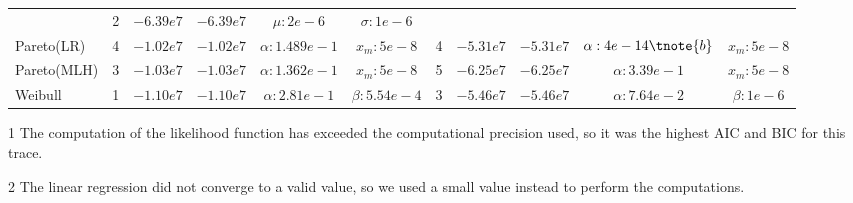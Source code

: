 \begin{table}[ht!]
{\begin{threeparttable}[t]
\begin{tabular}{lcccccccccc}
        &    2 & $-6.39e7$   & $-6.39e7$  & $\mu:2e-6$     & $\sigma:1e-6$ \\
        Pareto(LR)      &    4 & $-1.02e7$   & $-1.02e7$  & $\alpha:1.489e-1 $ & $x_m:5e-8 $    
        &    4 & $-5.31e7$   & $-5.31e7$  & $\alpha:4e-14\tnote{b}$ & $x_m:5e-8 $    \\
        Pareto(MLH)     &    3 & $-1.03e7$   & $-1.03e7$  & $\alpha:1.362e-1$ & $x_m:5e-8 $    
        &    5 & $-6.25e7$   & $-6.25e7$  & $\alpha:3.39e-1$ & $x_m:5e-8 $    \\
        Weibull         &    1 & $-1.10e7$   & $-1.10e7$  & $\alpha:2.81e-1$ & $\beta:5.54e-4$  
        &    3 & $-5.46e7$   & $-5.46e7$  & $\alpha:7.64e-2$ & $\beta:1e-6$  \\ \hline
    \end{tabular}
    \begin{tablenotes}
    \item[1] The computation of the likelihood function has exceeded the computational precision used, so it was the highest AIC and BIC  for this trace.
    \item[2] The linear regression did not converge to a valid value, so we used a small value instead to perform the computations.
    \end{tablenotes}
    \end{threeparttable}
    }
    \label{tab:prototype-results}
\end{table}


